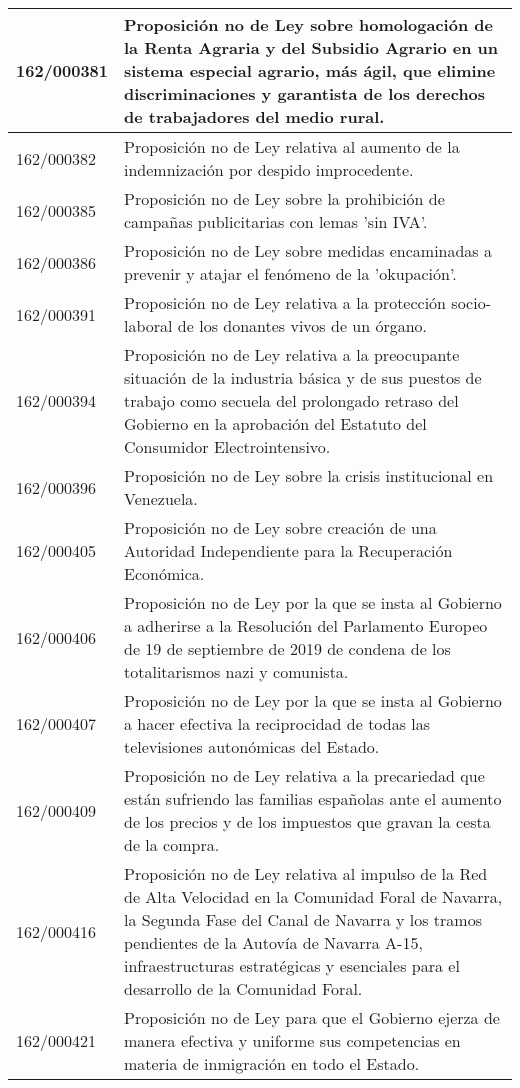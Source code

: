 {\begin{table}[H]
\begin{center}
\begin{tabularx}{\linewidth}{| l | X |}
\hline
162/000381 & Proposición no de Ley sobre homologación de la Renta Agraria y del Subsidio Agrario en un sistema especial agrario, más ágil, que elimine discriminaciones y garantista de los derechos de trabajadores del medio rural. \\
\hline
162/000382 & Proposición no de Ley relativa al aumento de la indemnización por despido improcedente. \\
\hline
162/000385 & Proposición no de Ley sobre la prohibición de campañas publicitarias con lemas 'sin IVA'. \\
\hline
162/000386 & Proposición no de Ley sobre medidas encaminadas a prevenir y atajar el fenómeno de la 'okupación'. \\
\hline
162/000391 & Proposición no de Ley relativa a la protección socio-laboral de los donantes vivos de un órgano. \\
\hline
162/000394 & Proposición no de Ley relativa a la preocupante situación de la industria básica y de sus puestos de trabajo como secuela del prolongado retraso del Gobierno en la aprobación del Estatuto del Consumidor Electrointensivo. \\
\hline
162/000396 & Proposición no de Ley sobre la crisis institucional en Venezuela. \\
\hline
162/000405 & Proposición no de Ley sobre creación de una Autoridad Independiente para la Recuperación Económica. \\
\hline
162/000406 & Proposición no de Ley por la que se insta al Gobierno a adherirse a la Resolución del Parlamento Europeo de 19 de septiembre de 2019 de condena de los totalitarismos nazi y comunista. \\
\hline
162/000407 & Proposición no de Ley por la que se insta al Gobierno a hacer efectiva la reciprocidad de todas las televisiones autonómicas del Estado. \\
\hline
162/000409 & Proposición no de Ley relativa a la precariedad que están sufriendo las familias españolas ante el aumento de los precios y de los impuestos que gravan la cesta de la compra. \\
\hline
162/000416 & Proposición no de Ley relativa al impulso de la Red de Alta Velocidad en la Comunidad Foral de Navarra, la Segunda Fase del Canal de Navarra y los tramos pendientes de la Autovía de Navarra A-15, infraestructuras estratégicas y esenciales para el desarrollo de la Comunidad Foral. \\
\hline
162/000421 & Proposición no de Ley para que el Gobierno ejerza de manera efectiva y uniforme sus competencias en materia de inmigración en todo el Estado. \\

\end{tabularx}
\end{center}
\end{table}}
